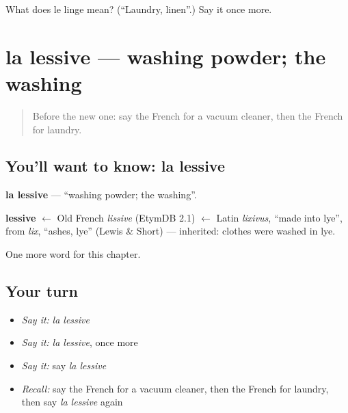 \begin{tcolorbox}[breakable,colback=teal!4,colframe=teal!35!black,title={Before you move on}]
What does le linge mean? (\textquotedblleft{}Laundry, linen\textquotedblright{}.) Say it once more.
\end{tcolorbox}
\section[la lessive]{la lessive — washing powder; the washing}

\label{lesson:FR-C115-lessive}



\begin{quote}
Before the new one: say the French for a vacuum cleaner, then the French for laundry.
\end{quote}

\subsection*{You'll want to know: la lessive}
\textbf{la lessive} — \textquotedblleft{}washing powder; the washing\textquotedblright{}.

\begin{cousinweb}
\textbf{lessive} $\leftarrow$ Old French \emph{lissive} (EtymDB 2.1) $\leftarrow$ Latin \emph{lixivus}, \textquotedblleft{}made into lye\textquotedblright{}, from \emph{lix}, \textquotedblleft{}ashes, lye\textquotedblright{} (Lewis \& Short) — inherited: clothes were washed in lye.
\end{cousinweb}

\begin{grammarlens}[title={What you've built}]
One more word for this chapter.
\end{grammarlens}

\subsection*{Your turn}
\begin{itemize}
\raggedright
  \item \emph{Say it:} \emph{la lessive}
  \item \emph{Say it:} \emph{la lessive}, once more
  \item \emph{Say it:} say \emph{la lessive}
  \item \emph{Recall:} say the French for a vacuum cleaner, then the French for laundry, then say \emph{la lessive} again
\end{itemize}

